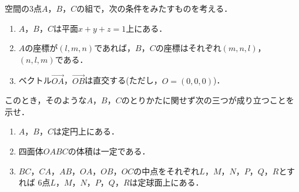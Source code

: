\documentclass[../../main.tex]{subfiles}
\begin{document}
空間の3点$A$，$B$，$C$の組で，次の条件をみたすものを考える．
\begin{enumerate}
  \item [\ding{"AC}]$A$，$B$，$C$は平面$x+y+z=1$上にある．
  \item [\ding{"AD}]$A$の座標が$(l,m,n)$であれば，$B$，$C$の座標はそれぞれ$(m,n,l)$，$(n,l,m)$である．
  \item [\ding{"AE}]ベクトル$\overrightarrow{OA}$，$\overrightarrow{OB}$は直交する(ただし，$O=(0,0,0)$)．
\end{enumerate}
このとき，そのような$A$，$B$，$C$のとりかたに関せず次の三つが成り立つことを示せ．
\begin{enumerate}
  \item $A$，$B$，$C$は定円上にある．
  \item 四面体$OABC$の体積は一定である．
  \item $BC$，$CA$，$AB$，$OA$，$OB$，$OC$の中点をそれぞれ$L$，$M$，$N$，$P$，$Q$，$R$とすれば
    6点$L$，$M$，$N$，$P$，$Q$，$R$は定球面上にある．
\end{enumerate}
\end{document}

